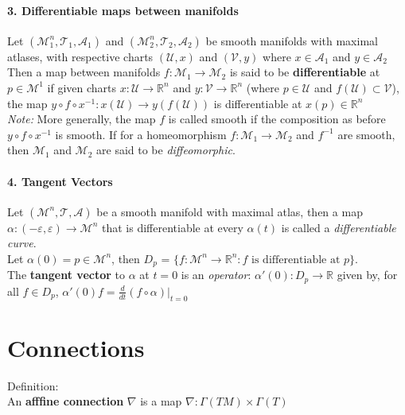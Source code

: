 \documentclass[11pt]{report}
\theoremstyle{thm}
\newcommand{\textem}[1]{\textcolor{mp}{\textbf{#1}}}
\newcommand{\bluetxt}[1]{\textcolor{mp}{#1}}
\begin{document}
\subsubsection{3. Differentiable maps between manifolds}
Let $(\mathcal{M}_1^n, \mathcal{T}_1, \mathcal{A}_1)$ and $(\mathcal{M}_2^n, 
\mathcal{T}_2,\mathcal{A}_2)$ be smooth manifolds with maximal 
atlases, with respective charts $(\mathcal{U}, x)$ and 
$(\mathcal{V}, y)$ where $x \in \mathcal{A}_1$ and $y \in 
\mathcal{A}_2$ \\[1em]
Then a map between manifolds $f: \mathcal{M}_1 \rightarrow \mathcal{M}_2$ is 
said to be 
\textem{differentiable} at $p\in \mathcal{M}^1$ if given charts $x: \mathcal{U} 
\rightarrow \mathbb{R}^n$ and $y: \mathcal{V} \rightarrow \mathbb{R}^n$ 
(where $p\in \mathcal{U}$ and $f(\mathcal{U})\subset \mathcal{V}$), 
the map $y \circ f \circ x^{-1}: x(\mathcal{U}) \rightarrow 
y(f(\mathcal{U}))$ is differentiable at $x(p) \in \mathbb{R}^n$\\[1em]
\textit{Note:} More generally, the map $f$ is called smooth if the composition 
as before $y \circ f \circ x^{-1}$ is smooth. If for a homeomorphism $f: 
\mathcal{M}_1 \rightarrow \mathcal{M}_2$ and $f^{-1}$ are smooth, then 
$\mathcal{M}_1$ and $\mathcal{M}_2$ are said to be \textit{diffeomorphic}.
\newpage\noindent 
\subsubsection{4. Tangent Vectors}
Let $(\mathcal{M}^n, \mathcal{T}, \mathcal{A})$ be a smooth manifold with 
maximal atlas, then a map $\alpha: (-\varepsilon, \varepsilon) \rightarrow 
\mathcal{M}^n$ that is differentiable at every $\alpha(t)$ is called a 
\textit{differentiable curve}.\\[1em]
Let $\alpha(0)= p \in \mathcal{M}^n$, then $D_p$ = $\{f: \mathcal{M}^n 
\rightarrow \mathbb{R}^n: f \text{ is differentiable at } p\}$.\\[1em]
The \textem{tangent vector} to $\alpha$ at $t=0$ is an \textit{operator}: 
$\alpha'(0): D_p \rightarrow \mathbb{R}$ given by, for all $f \in D_p$, 
$\alpha'(0) f = \displaystyle\frac{d}{dt}(f \circ \alpha)\bigg|_{t=0}$
\chapter{Connections}
\bluetxt{Definition:}\\[1em]
An \textem{afffine connection} $\nabla$ is a map $\nabla : \Gamma(TM)\times 
\Gamma(T)$
\end{document}
